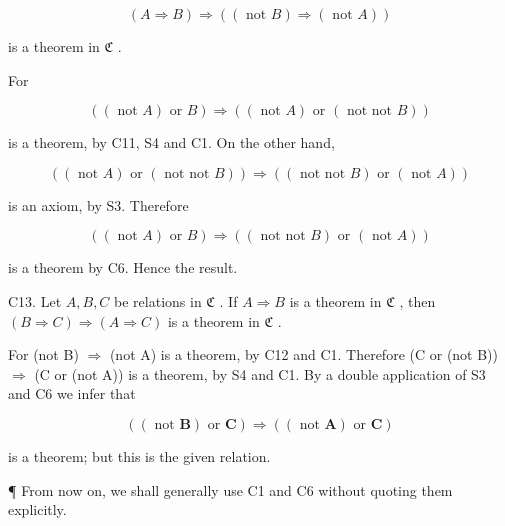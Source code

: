\[
(A \Rightarrow B) \Rightarrow ((\text { not } B) \Rightarrow (\text { not } A))
\]

is a theorem in \(\mathfrak{C}\) .

For

\[
((\text { not } A) \text { or } B) \Longrightarrow ((\text { not } A) \text { or } (\text { not   not } B))
\]

is a theorem, by C11, S4 and C1. On the other hand,

\[
((\text { not } A) \text { or } (\text { not   not } B)) \Longrightarrow ((\text { not   not } B) \text { or } (\text { not } A))
\]

is an axiom, by S3. Therefore

\[
((\text { not } A) \text { or } B) \Longrightarrow ((\text { not   not } B) \text { or } (\text { not } A))
\]

is a theorem by C6. Hence the result.

C13. Let \(A, B, C\) be relations in \(\mathfrak{C}\) . If \(A \Rightarrow B\) is a theorem in \(\mathfrak{C}\) , then \((B \Rightarrow C) \Rightarrow (A \Rightarrow C)\) is a theorem in \(\mathfrak{C}\) .

For (not B) \(\Longrightarrow\) (not A) is a theorem, by C12 and C1. Therefore (C or (not B)) \(\Longrightarrow\) (C or (not A)) is a theorem, by S4 and C1. By a double application of S3 and C6 we infer that

\[
((\text { not } \boldsymbol {B}) \text { or } \boldsymbol {C}) \Longrightarrow ((\text { not } \boldsymbol {A}) \text { or } \boldsymbol {C})
\]

is a theorem; but this is the given relation.

¶ From now on, we shall generally use C1 and C6 without quoting them explicitly.

